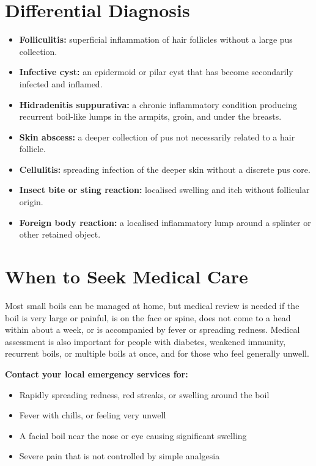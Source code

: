 \section*{Differential Diagnosis}
\begin{itemize}
    \item \textbf{Folliculitis:} superficial inflammation of hair follicles without a large pus collection.
    \item \textbf{Infective cyst:} an epidermoid or pilar cyst that has become secondarily infected and inflamed.
    \item \textbf{Hidradenitis suppurativa:} a chronic inflammatory condition producing recurrent boil-like lumps in the armpits, groin, and under the breasts.
    \item \textbf{Skin abscess:} a deeper collection of pus not necessarily related to a hair follicle.
    \item \textbf{Cellulitis:} spreading infection of the deeper skin without a discrete pus core.
    \item \textbf{Insect bite or sting reaction:} localised swelling and itch without follicular origin.
    \item \textbf{Foreign body reaction:} a localised inflammatory lump around a splinter or other retained object.
\end{itemize}

\section*{When to Seek Medical Care}
Most small boils can be managed at home, but medical review is needed if the boil is very large or painful, is on the face or spine, does not come to a head within about a week, or is accompanied by fever or spreading redness. Medical assessment is also important for people with diabetes, weakened immunity, recurrent boils, or multiple boils at once, and for those who feel generally unwell.

\textbf{Contact your local emergency services for:}
\begin{itemize}
    \item Rapidly spreading redness, red streaks, or swelling around the boil
    \item Fever with chills, or feeling very unwell
    \item A facial boil near the nose or eye causing significant swelling
    \item Severe pain that is not controlled by simple analgesia
\end{itemize}

